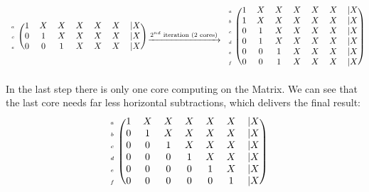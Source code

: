 \documentclass[draft, final]{vutinfth} %
\begin{document}
				\begin{equation}
					\begin{aligned}
						\begin{blockarray}{cccccccc}
							\begin{block}{c(ccccccc)}
								\scriptscriptstyle{a} & 1 & X & X & X & X & X &| X \\ 
								\scriptscriptstyle{c} & 0 & 1 & X & X & X & X &| X \\ 
								\scriptscriptstyle{e} & 0 & 0 & 1 & X & X & X &| X \\ 
							\end{block}
						\end{blockarray}
						\xrightarrow[]{\text{$2^{nd}$ iteration (2 cores)}}
						\begin{blockarray}{cccccccc}
							\begin{block}{c(ccccccc)}
								\scriptscriptstyle{a} & 1 & X & X & X & X & X &| X \\ 
								\scriptscriptstyle{b} & 1 & X & X & X & X & X &| X \\ 
								\scriptscriptstyle{c} & 0 & 1 & X & X & X & X &| X \\ 
								\scriptscriptstyle{d} & 0 & 1 & X & X & X & X &| X \\ 
								\scriptscriptstyle{e} & 0 & 0 & 1 & X & X & X &| X \\ 
								\scriptscriptstyle{f} & 0 & 0 & 1 & X & X & X &| X \\
							\end{block}
						\end{blockarray}
					\end{aligned}
				\end{equation}
				In the last step there is only one core computing on the Matrix. We can see that the last core needs far less horizontal subtractions, which delivers the final result:
				\begin{equation}
					\begin{aligned}
						\begin{blockarray}{cccccccc}
							\begin{block}{c(ccccccc)}
								\scriptscriptstyle{a} & 1 & X & X & X & X & X &| X \\ 
								\scriptscriptstyle{b} & 0 & 1 & X & X & X & X &| X \\ 
								\scriptscriptstyle{c} & 0 & 0 & 1 & X & X & X &| X \\ 
								\scriptscriptstyle{d} & 0 & 0 & 0 & 1 & X & X &| X \\ 
								\scriptscriptstyle{e} & 0 & 0 & 0 & 0 & 1 & X &| X \\ 
								\scriptscriptstyle{f} & 0 & 0 & 0 & 0 & 0 & 1 &| X \\
							\end{block}
						\end{blockarray}
					\end{aligned}
				\end{equation}
\end{document}
